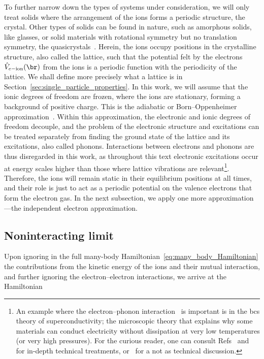To further narrow down the types of systems under consideration, we will only treat solids where the arrangement of the ions forms a periodic structure, the crystal.
Other types of solids can be found in nature, such as amorphous solids, like glasses, or solid materials with rotational symmetry but no translation symmetry, the quasicrystals~\cite{Chaikin_Lubensky_1995}.
Herein, the ions occupy positions in the crystalline structure, also called the lattice, such that the potential felt by the electrons $\hat{V}_{e-\mathrm{ion}}(\br)$ from the ions is a periodic function with the periodicity of the lattice.
We shall define more precisely what a lattice is in Section~\ref{sec:single_particle_properties}.
In this work, we will assume that the ionic degrees of freedom are frozen, where the ions are stationary, forming a background of positive charge.
This is the adiabatic or Born--Oppenheimer approximation~\cite{Kittel_2004,Simon_Oxford_2013,Martin_2004}.
Within this approximation, the electronic and ionic degrees of freedom decouple, and the problem of the electronic structure and excitations can be treated separately from finding the ground state of the lattice and its excitations, also called phonons.
Interactions between electrons and phonons are thus disregarded in this work, as throughout this text electronic excitations occur at energy scales higher than those where lattice vibrations are relevant\footnote{An example where the electron--phonon interaction~\cite{Giustino_2017} is important is in the \gls{bcs} theory of superconductivity; the microscopic theory that explains why some materials can conduct electricity without dissipation at very low temperatures (or very high pressures). For the curious reader, one can consult Refs~\cite{Bruus_Flensberg_2004} and~\cite{Mahan} for in-depth technical treatments, or~\cite{Cohen_Louie_2016} for a not as technical discussion.}.
Therefore, the ions will remain static in their equilibrium positions at all times, and their role is just to act as a periodic potential on the valence electrons that form the electron gas.
In the next subsection, we apply one more approximation---the independent electron approximation.

\subsection{Noninteracting limit}
\label{subsec:non_interacting_limit}

Upon ignoring in the full many-body Hamiltonian~\eqref{eq:many_body_Hamiltonian} the contributions from the kinetic energy of the ions and their mutual interaction, and further ignoring the electron--electron interactions, we arrive at the Hamiltonian

